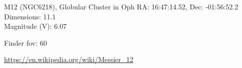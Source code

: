 \begin{block}{M12 (NGC6218), Globular Cluster in Oph}
    RA: 16:47:14.52, Dec: -01:56:52.2 \\ 
    Dimensions: 11.1 \\ 
    Magnitude (V): 6.07



    Finder fov: 60 

    \url{https://en.wikipedia.org/wiki/Messier_12} 
\end{block}